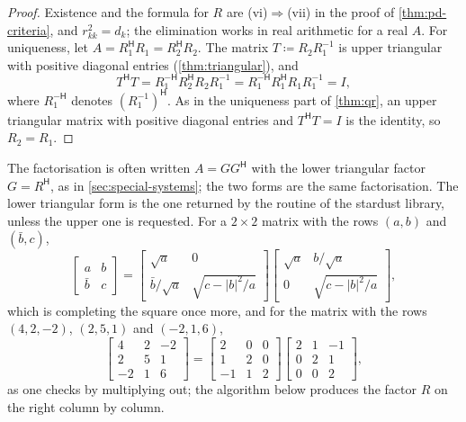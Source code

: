\begin{proof}
Existence and the formula for $R$ are (vi)$\Rightarrow$(vii) in the proof of \cref{thm:pd-criteria}, and $r_{kk}^2=d_k$; the elimination works in real arithmetic for a real $A$. For uniqueness, let $A=R_1^{\mathsf H}R_1=R_2^{\mathsf H}R_2$. The matrix $T\coloneqq R_2R_1^{-1}$ is upper triangular with positive diagonal entries (\cref{thm:triangular}), and
\[
T^{\mathsf H}T=R_1^{-\mathsf H}R_2^{\mathsf H}R_2R_1^{-1}=R_1^{-\mathsf H}R_1^{\mathsf H}R_1R_1^{-1}=I ,
\]
where $R_1^{-\mathsf H}$ denotes $(R_1^{-1})^{\mathsf H}$. As in the uniqueness part of \cref{thm:qr}, an upper triangular matrix with positive diagonal entries and $T^{\mathsf H}T=I$ is the identity, so $R_2=R_1$.
\end{proof}

The factorisation is often written $A=GG^{\mathsf H}$ with the lower triangular factor $G=R^{\mathsf H}$, as in \cref{sec:special-systems}; the two forms are the same factorisation. The lower triangular form is the one returned by the routine  of the stardust library, unless the upper one is requested. For a $2\times2$ matrix with the rows $(a,b)$ and $(\bar b,c)$,
\[
\begin{bmatrix}a&b\\\bar b&c\end{bmatrix}=\begin{bmatrix}\sqrt a&0\\\bar b/\sqrt a&\sqrt{c-|b|^2/a}\end{bmatrix}\begin{bmatrix}\sqrt a&b/\sqrt a\\0&\sqrt{c-|b|^2/a}\end{bmatrix},
\]
which is completing the square once more, and for the matrix with the rows $(4,2,-2)$, $(2,5,1)$ and $(-2,1,6)$,
\[
\begin{bmatrix}4&2&-2\\2&5&1\\-2&1&6\end{bmatrix}=\begin{bmatrix}2&0&0\\1&2&0\\-1&1&2\end{bmatrix}\begin{bmatrix}2&1&-1\\0&2&1\\0&0&2\end{bmatrix},
\]
as one checks by multiplying out; the algorithm below produces the factor $R$ on the right column by column.

